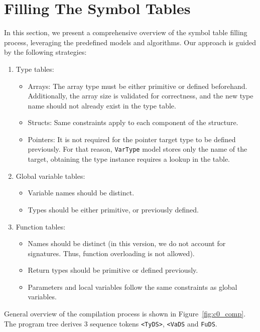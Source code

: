 \section{Filling The Symbol Tables}\label{sec:using-new-tools-for-filling-the-symbol-tables}
In this section, we present a comprehensive overview of the symbol table filling process, leveraging the predefined models and algorithms.
Our approach is guided by the following strategies:
\begin{enumerate}
    \item Type tables:
    \begin{itemize}
        \item Arrays: The array type must be either primitive or defined beforehand.
        Additionally, the array size is validated for correctness, and the new type name should not already exist in the type table.

        \item Structs: Same constraints apply to each component of the structure.
        \item Pointers: It is not required for the pointer target type to be defined previously.
        For that reason, \verb+VarType+ model stores only the name of the target, obtaining the type instance
        requires a lookup in the table.
    \end{itemize}
    \item Global variable tables:
    \begin{itemize}
        \item Variable names should be distinct.
        \item Types should be either primitive, or previously defined.
    \end{itemize}
    \item Function tables:
    \begin{itemize}
        \item Names should be distinct (in this version, we do not account for signatures.
        Thus, function overloading is not allowed).
        \item Return types should be primitive or defined previously.
        \item Parameters and local variables follow the same constraints as global variables.
    \end{itemize}
\end{enumerate}
General overview of the compilation process is shown in Figure~\ref{fig:c0_comp}.
The program tree derives 3 sequence tokens \verb+<TyDS>+, \verb+<VaDS+ and \verb+FuDS+.
